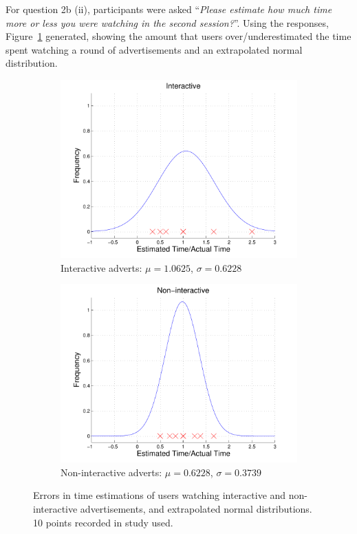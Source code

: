 	For question 2b (ii), participants were asked ``\textit{Please estimate how much time more or less you were watching in the second session?}''. Using the responses, Figure~\ref{fig:time_perception} generated, showing the amount that users over/underestimated the time spent watching a round of advertisements and an extrapolated normal distribution.
	\begin{figure}[h!]
		\centering
		\begin{subfigure}[h]{0.49\textwidth}
			\centering
			\includegraphics[width=\textwidth]{images/interactive_bell.pdf}
			\caption{Interactive adverts: $\mu=1.0625$, $\sigma=0.6228$}
		\end{subfigure}
		\begin{subfigure}[h]{0.49\textwidth}
			\centering
			\includegraphics[width=\textwidth]{images/noninteractive_bell.pdf}
			\caption{Non-interactive adverts: $\mu=0.6228$, $\sigma=0.3739$}
		\end{subfigure}
		\caption{Errors in time estimations of users watching interactive and non-interactive advertisements, and extrapolated normal distributions. 10 points recorded in study used.}
		\label{fig:time_perception}
	\end{figure}
